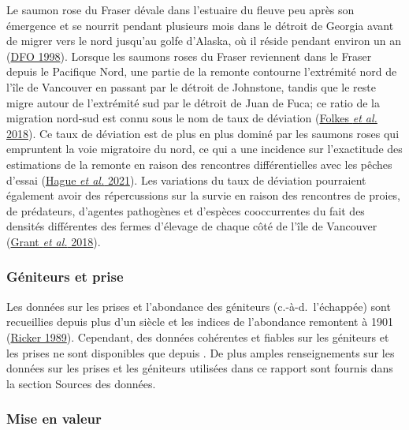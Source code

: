 \documentclass[french,11pt]{book}
\begin{document}
Le saumon rose du Fraser dévale dans l'estuaire du fleuve peu après son émergence et se nourrit pendant plusieurs mois dans le détroit de Georgia avant de migrer vers le nord jusqu'au golfe d'Alaska, où il réside pendant environ un an (\protect\hyperlink{ref-dfoFraserRiverSalmon1998}{DFO 1998}). Lorsque les saumons roses du Fraser reviennent dans le Fraser depuis le Pacifique Nord, une partie de la remonte contourne l'extrémité nord de l'île de Vancouver en passant par le détroit de Johnstone, tandis que le reste migre autour de l'extrémité sud par le détroit de Juan de Fuca; ce ratio de la migration nord-sud est connu sous le nom de taux de déviation (\protect\hyperlink{ref-folkesEvaluatingModelsForecast2018}{Folkes \emph{et al.} 2018}). Ce taux de déviation est de plus en plus dominé par les saumons roses qui empruntent la voie migratoire du nord, ce qui a une incidence sur l'exactitude des estimations de la remonte en raison des rencontres différentielles avec les pêches d'essai (\protect\hyperlink{ref-hagueMovingTargetsAssessing2021}{Hague \emph{et al.} 2021}). Les variations du taux de déviation pourraient également avoir des répercussions sur la survie en raison des rencontres de proies, de prédateurs, d'agentes pathogènes et d'espèces cooccurrentes du fait des densités différentes des fermes d'élevage de chaque côté de l'île de Vancouver (\protect\hyperlink{ref-grantSummaryFraserRiver2018}{Grant \emph{et al.} 2018}).

\hypertarget{guxe9niteurs-et-prise}{%
\subsubsection{Géniteurs et prise}\label{guxe9niteurs-et-prise}}

Les données sur les prises et l'abondance des géniteurs (c.-à-d.~l'échappée) sont recueillies depuis plus d'un siècle et les indices de l'abondance remontent à 1901 (\protect\hyperlink{ref-rickerHistoryPresentState1989}{Ricker 1989}). Cependant, des données cohérentes et fiables sur les géniteurs et les prises ne sont disponibles que depuis . De plus amples renseignements sur les données sur les prises et les géniteurs utilisées dans ce rapport sont fournis dans la section Sources des données.

\hypertarget{mise-en-valeur}{%
\subsubsection{Mise en valeur}\label{mise-en-valeur}}
\end{document}
